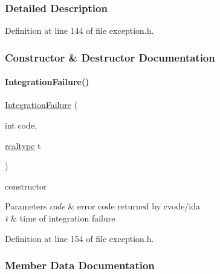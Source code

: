\subsubsection{Detailed Description}


Definition at line 144 of file exception.\+h.



\subsubsection{Constructor \& Destructor Documentation}
\mbox{\label{classamici_1_1_integration_failure_a3e72353970444d949c15761bdcbc5e7f}} 
\paragraph{\texorpdfstring{Integration\+Failure()}{IntegrationFailure()}}
{\footnotesize\ttfamily \mbox{\hyperlink{classamici_1_1_integration_failure}{Integration\+Failure}} (\begin{DoxyParamCaption}\item[{int}]{code,  }\item[{\mbox{\hyperlink{namespaceamici_a1bdce28051d6a53868f7ccbf5f2c14a3}{realtype}}}]{t }\end{DoxyParamCaption})}

constructor 
\begin{DoxyParams}{Parameters}
{\em code} & error code returned by cvode/ida \\
\hline
{\em t} & time of integration failure \\
\hline
\end{DoxyParams}


Definition at line 154 of file exception.\+h.



\subsubsection{Member Data Documentation}
\mbox{\label{classamici_1_1_integration_failure_a7d16b1c68c87cec009d972e79abfba78}} 
